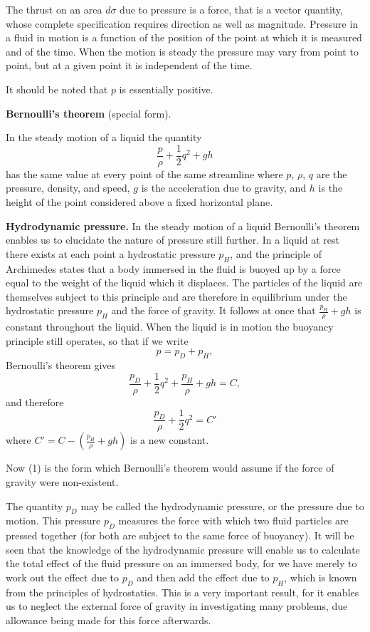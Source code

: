 \documentclass[a4paper]{article}
\newcommand{\Eqn}[1]{\begin{equation}#1\end{equation}}
\begin{document}
The thrust on an area $d \sigma$ due to pressure is a force, that is a vector quantity, whose complete specification requires
direction as well as magnitude. Pressure in a fluid in motion is a function of the position of the point at which it is measured
and of the time. When the motion is steady the pressure may vary from point to point, but at a given point it is independent of
the time.

It should be noted that $p$ is essentially positive.

\textbf{Bernoulli's theorem} (special form).

In the steady motion of a liquid the quantity
$$\frac{p}{\rho}+\frac{1}{2}q^2+gh$$
has the same value at every point of the same streamline where $p$, $\rho$, $q$ are the pressure, density, and speed, $g$ is
the acceleration due to gravity, and $h$ is the height of the point considered above a fixed horizontal plane.

\textbf{Hydrodynamic pressure.} In the steady motion of a liquid Bernoulli's theorem enables us to elucidate the nature of
pressure still further. In a liquid at rest there exists at each point a hydrostatic pressure $p_H$, and the principle of
Archimedes states that a body immersed in the fluid is buoyed up by a force equal to the weight of the liquid which it displaces.
The particles of the liquid are themselves subject to this principle and are therefore in equilibrium under the hydrostatic
pressure $p_H$ and the force of gravity. It follows at once that $\frac{p_H}{\rho}+gh$ is constant throughout the liquid.
When the liquid is in motion the buoyancy principle still operates, so that if we write
$$p=p_D+p_H,$$
Bernoulli's theorem gives
$$\frac{p_D}{\rho}+\frac{1}{2}q^2+\frac{p_H}{\rho}+gh=C,$$
and therefore
\Eqn{\frac{p_D}{\rho}+\frac{1}{2}q^2=C'}
where $C'=C-(\frac{p_H}{\rho}+gh)$ is a new constant.

Now (1) is the form which Bernoulli's theorem would assume if the force of gravity were non-existent.

The quantity $p_D$ may be called the hydrodynamic pressure, or the pressure due to motion. This pressure $p_D$ measures the force
with which two fluid particles are pressed together (for both are subject to the same force of buoyancy). It will be seen that
the knowledge of the hydrodynamic pressure will enable us to calculate the total effect of the fluid pressure on an immersed body,
for we have merely to work out the effect due to $p_D$ and then add the effect due to $p_H$, which is known from the principles
of hydrostatics. This is a very important result, for it enables us to neglect the external force of gravity in investigating
many problems, due allowance being made for this force afterwards.
\end{document}
